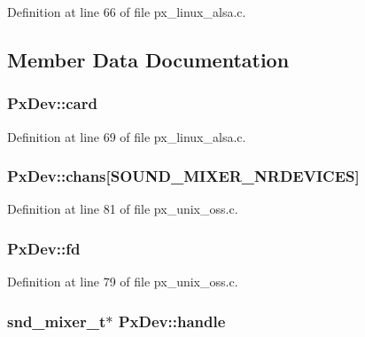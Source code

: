 Definition at line 66 of file px\+\_\+linux\+\_\+alsa.\+c.



\subsection{Member Data Documentation}
\subsubsection[{\texorpdfstring{card}{card}}]{ Px\+Dev\+::card}\hypertarget{struct_px_dev_a137b489e777aee4166eaf6187194f679}{}\label{struct_px_dev_a137b489e777aee4166eaf6187194f679}


Definition at line 69 of file px\+\_\+linux\+\_\+alsa.\+c.

\subsubsection[{\texorpdfstring{chans}{chans}}]{ Px\+Dev\+::chans\mbox{[}S\+O\+U\+N\+D\+\_\+\+M\+I\+X\+E\+R\+\_\+\+N\+R\+D\+E\+V\+I\+C\+ES\mbox{]}}\hypertarget{struct_px_dev_a257da37c1b421eec16020585d9291e3b}{}\label{struct_px_dev_a257da37c1b421eec16020585d9291e3b}


Definition at line 81 of file px\+\_\+unix\+\_\+oss.\+c.

\subsubsection[{\texorpdfstring{fd}{fd}}]{ Px\+Dev\+::fd}\hypertarget{struct_px_dev_a132f899f97616da06340264b9e2f3947}{}\label{struct_px_dev_a132f899f97616da06340264b9e2f3947}


Definition at line 79 of file px\+\_\+unix\+\_\+oss.\+c.

\subsubsection[{\texorpdfstring{handle}{handle}}]{\setlength{\rightskip}{0pt plus 5cm}snd\+\_\+mixer\+\_\+t$\ast$ Px\+Dev\+::handle}\hypertarget{struct_px_dev_a33e59c1f53433e686aab9aa2ffa905ce}{}\label{struct_px_dev_a33e59c1f53433e686aab9aa2ffa905ce}


